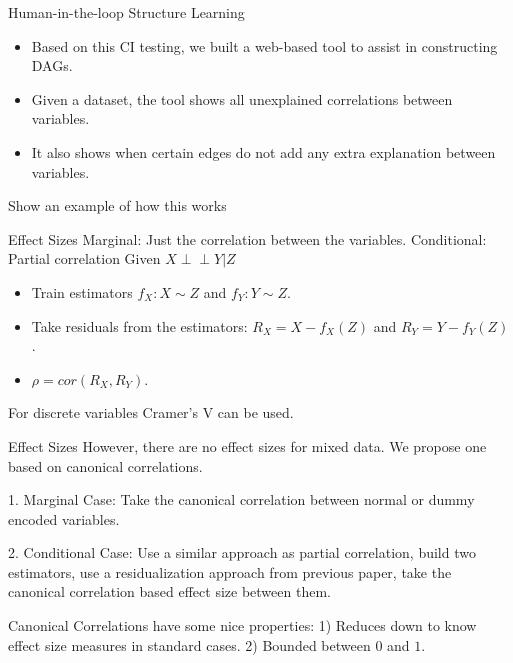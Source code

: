 \documentclass{beamer}
\def\ci{\perp\!\!\!\!\!\perp}
\begin{document}
\begin{frame}{Human-in-the-loop Structure Learning}
	\begin{itemize}
		\item Based on this CI testing, we built a web-based tool to assist in constructing DAGs.
		\item Given a dataset, the tool shows all unexplained correlations between variables.
		\item It also shows when certain edges do not add any extra explanation between variables.
	\end{itemize}
\end{frame}

\begin{frame}{Show an example of how this works}
\end{frame}

\begin{frame}{Effect Sizes}
	Marginal: Just the correlation between the variables.
	Conditional: Partial correlation
	Given $ X \ci Y | Z $
	\begin{itemize}
		\item Train estimators $ f_X: X \sim Z $ and $ f_Y: Y \sim Z $.
		\item Take residuals from the estimators: $ R_X = X - f_X(Z) $ and $ R_Y = Y - f_Y(Z) $.
		\item $ \rho = cor(R_X, R_Y) $.
	\end{itemize}

	For discrete variables Cramer's V can be used.
\end{frame}

\begin{frame}{Effect Sizes}
	However, there are no effect sizes for mixed data. We propose one based on
	canonical correlations.

	1. Marginal Case: Take the canonical correlation between normal or dummy encoded variables.

	2. Conditional Case: Use a similar approach as partial correlation, build two 
		estimators, use a residualization approach from previous paper, take
		the canonical correlation based effect size between them.


\end{frame}

\begin{frame}

	Canonical Correlations have some nice properties: 1) Reduces down to know effect size measures in standard cases. 2) Bounded between $ 0 $ and $ 1 $.

\end{frame}
\end{document}
